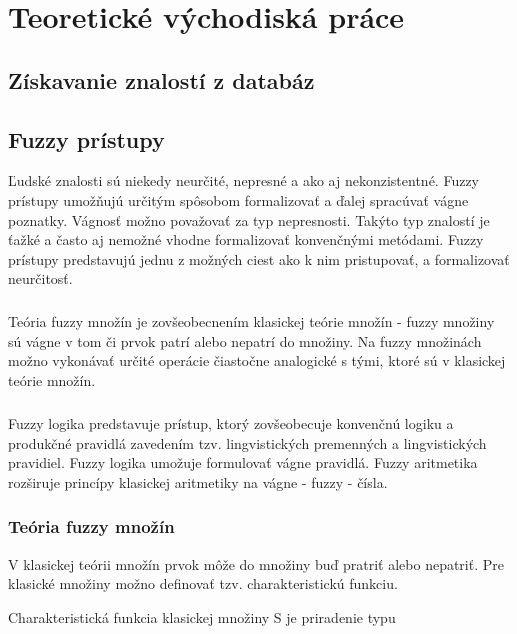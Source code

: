 \chapter{Teoretické východiská práce} 

\section{Získavanie znalostí z databáz }

\section{Fuzzy prístupy}

Ľudské znalosti sú niekedy neurčité, nepresné a ako aj nekonzistentné. 
Fuzzy prístupy umožňujú určitým spôsobom formalizovať a ďalej spracúvať vágne poznatky. Vágnosť možno považovať za typ nepresnosti. Takýto typ znalostí je ťažké a často aj nemožné vhodne formalizovať konvenčnými metódami. Fuzzy prístupy predstavujú jednu z možných ciest ako k nim pristupovať, a formalizovať neurčitosť. 
\paragraph{}
Teória fuzzy množín je zovšeobecnením klasickej teórie množín - fuzzy množiny sú vágne v tom či prvok patrí alebo nepatrí do množiny. 
Na fuzzy množinách možno vykonávať určité operácie čiastočne analogické s tými, ktoré sú v klasickej teórie množín. 
\paragraph{}
Fuzzy logika predstavuje prístup, ktorý zovšeobecuje konvenčnú logiku a produkčné pravidlá zavedením tzv. lingvistických premenných a lingvistických pravidiel. 
Fuzzy logika umožuje formulovať vágne pravidlá. 
Fuzzy aritmetika rozširuje princípy klasickej aritmetiky na vágne - fuzzy - čísla. 

\subsection{Teória fuzzy množín}

V klasickej teórii množín prvok môže do množiny buď pratriť alebo nepatriť. Pre klasické množiny možno definovať tzv. charakteristickú funkciu. 

Charakteristická funkcia klasickej množiny S je priradenie typu 

